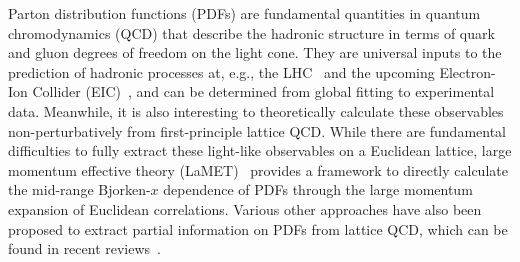 \documentclass[floatfix,twocolumn,prl,showpacs,preprintnumbers,amsmath,nofootinbib,amssymb,noeprint,superscriptaddress]{revtex4-1}
\begin{document}
\maketitle
{}
Parton distribution functions (PDFs) are fundamental quantities in quantum chromodynamics (QCD) that describe the hadronic structure in terms of quark and gluon degrees of freedom on the light cone. They are universal inputs to the prediction of hadronic processes at, e.g., the LHC~\cite{ATLAS:2019mfr} and the upcoming Electron-Ion Collider (EIC)~\cite{Accardi:2012qut,AbdulKhalek:2021gbh}, and can be determined from global fitting to experimental data.
Meanwhile, it is also interesting to theoretically calculate these observables non-perturbatively from first-principle lattice QCD. While there are fundamental difficulties to fully extract these light-like observables on a Euclidean lattice, large momentum effective theory (LaMET)~\cite{Ji:2013dva,Ji:2014gla} provides a framework to directly calculate the mid-range Bjorken-$x$ dependence of PDFs through the large momentum expansion of Euclidean correlations. Various other approaches have also been proposed to extract partial information on PDFs from lattice QCD, which can be found in recent reviews~\cite{Lin:2017snn,Cichy:2018mum,Constantinou:2020pek,Constantinou:2020pek,Constantinou:2022yye,Lin:2025hka}.
\end{document}
